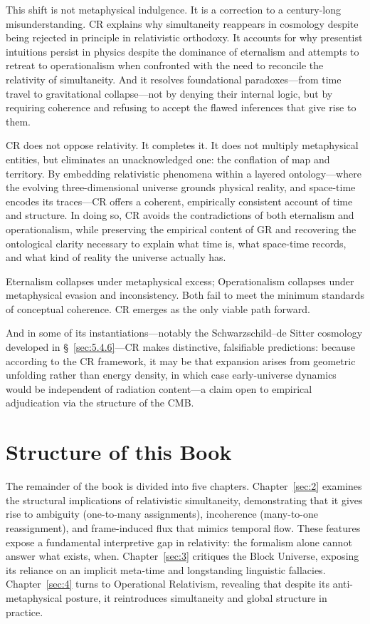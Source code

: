 \documentclass[12pt]{book}
\begin{document}
This shift is not metaphysical indulgence. It is a correction to a century-long misunderstanding. CR explains why simultaneity reappears in cosmology despite being rejected in principle in relativistic orthodoxy. It accounts for why presentist intuitions persist in physics despite the dominance of eternalism and attempts to retreat to operationalism when confronted with the need to reconcile the relativity of simultaneity. And it resolves foundational paradoxes---from time travel to gravitational collapse---not by denying their internal logic, but by requiring coherence and refusing to accept the flawed inferences that give rise to them.

CR does not oppose relativity. It completes it. It does not multiply metaphysical entities, but eliminates an unacknowledged one: the conflation of map and territory. By embedding relativistic phenomena within a layered ontology---where the evolving three-dimensional universe grounds physical reality, and space-time encodes its traces---CR offers a coherent, empirically consistent account of time and structure. In doing so, CR avoids the contradictions of both eternalism and operationalism, while preserving the empirical content of GR and recovering the ontological clarity necessary to explain what time is, what space-time records, and what kind of reality the universe actually has. 

Eternalism collapses under metaphysical excess; Operationalism collapses under metaphysical evasion and inconsistency. Both fail to meet the minimum standards of conceptual coherence. CR emerges as the only viable path forward.

And in some of its instantiations---notably the Schwarzschild–de Sitter cosmology developed in \S~\ref{sec:5.4.6}---CR makes distinctive, falsifiable predictions: because according to the CR framework, it may be that expansion arises from geometric unfolding rather than energy density, in which case early-universe dynamics would be independent of radiation content---a claim open to empirical adjudication via the structure of the CMB. 

\section{Structure of this Book}

The remainder of the book is divided into five chapters. Chapter~\ref{sec:2} examines the structural implications of relativistic simultaneity, demonstrating that it gives rise to ambiguity (one-to-many assignments), incoherence (many-to-one reassignment), and frame-induced flux that mimics temporal flow. These features expose a fundamental interpretive gap in relativity: the formalism alone cannot answer what exists, when. Chapter~\ref{sec:3} critiques the Block Universe, exposing its reliance on an implicit meta-time and longstanding linguistic fallacies. Chapter~\ref{sec:4} turns to Operational Relativism, revealing that despite its anti-metaphysical posture, it reintroduces simultaneity and global structure in practice.
\end{document}
